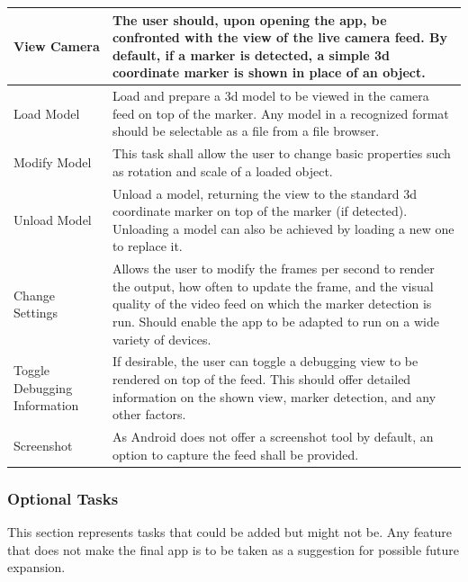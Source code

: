 \begin{tabulary}{\textwidth}{L || L}
View Camera & The user should, upon opening the app, be confronted with the view of the live camera feed. By default, if a marker is detected, a simple 3d coordinate marker is shown in place of an object. \\
\hline
Load Model & Load and prepare a 3d model to be viewed in the camera feed on top of the marker. Any model in a recognized format should be selectable as a file from a file browser. \\
\hline
Modify Model & This task shall allow the user to change basic properties such as rotation and scale of a loaded object.\\
\hline
Unload Model & Unload a model, returning the view to the standard 3d coordinate marker on top of the marker (if detected). Unloading a model can also be achieved by loading a new one to replace it. \\
\hline
Change Settings & Allows the user to modify the frames per second to render the output, how often to update the frame, and the visual quality of the video feed on which the marker detection is run. Should enable the app to be adapted to run on a wide variety of devices.\\
\hline
Toggle Debugging Information & If desirable, the user can toggle a debugging view to be rendered on top of the feed. This should offer detailed information on the shown view, marker detection, and any other factors. \\
\hline
Screenshot & As Android does not offer a screenshot tool by default, an option to capture the feed shall be provided. \\
\end{tabulary}

\subsubsection*{Optional Tasks}

This section represents tasks that could be added but might not be.
Any feature that does not make the final app is to be taken as a suggestion for possible future expansion.

